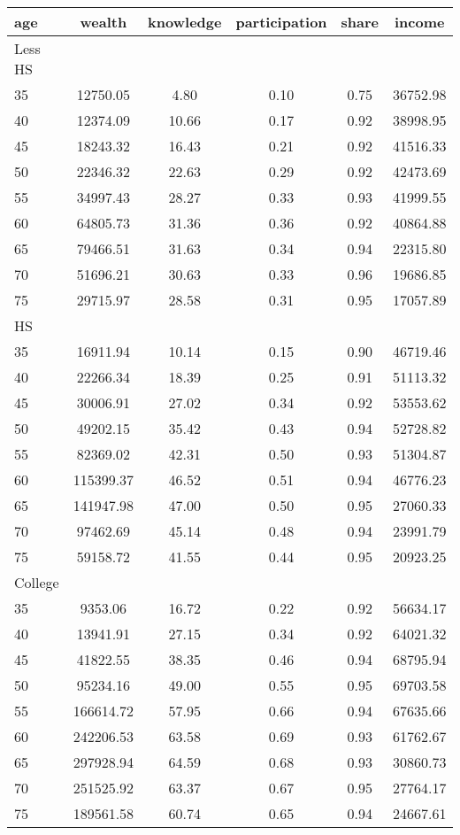 \begin{tabular}{lccccc}
 \hline \hline
  age & wealth & knowledge & participation & share & income \\
 \hline
 Less HS & & & & & \\
 \hline
35 &  12750.05 &      4.80 &      0.10 &      0.75 &  36752.98 \\ 
40 &  12374.09 &     10.66 &      0.17 &      0.92 &  38998.95 \\ 
45 &  18243.32 &     16.43 &      0.21 &      0.92 &  41516.33 \\ 
50 &  22346.32 &     22.63 &      0.29 &      0.92 &  42473.69 \\ 
55 &  34997.43 &     28.27 &      0.33 &      0.93 &  41999.55 \\ 
60 &  64805.73 &     31.36 &      0.36 &      0.92 &  40864.88 \\ 
65 &  79466.51 &     31.63 &      0.34 &      0.94 &  22315.80 \\ 
70 &  51696.21 &     30.63 &      0.33 &      0.96 &  19686.85 \\ 
75 &  29715.97 &     28.58 &      0.31 &      0.95 &  17057.89 \\ 
 \hline
 HS & & & & & \\
 \hline
35 &  16911.94 &     10.14 &      0.15 &      0.90 &  46719.46 \\ 
40 &  22266.34 &     18.39 &      0.25 &      0.91 &  51113.32 \\ 
45 &  30006.91 &     27.02 &      0.34 &      0.92 &  53553.62 \\ 
50 &  49202.15 &     35.42 &      0.43 &      0.94 &  52728.82 \\ 
55 &  82369.02 &     42.31 &      0.50 &      0.93 &  51304.87 \\ 
60 & 115399.37 &     46.52 &      0.51 &      0.94 &  46776.23 \\ 
65 & 141947.98 &     47.00 &      0.50 &      0.95 &  27060.33 \\ 
70 &  97462.69 &     45.14 &      0.48 &      0.94 &  23991.79 \\ 
75 &  59158.72 &     41.55 &      0.44 &      0.95 &  20923.25 \\ 
 \hline
 College & & & & & \\
 \hline
35 &   9353.06 &     16.72 &      0.22 &      0.92 &  56634.17 \\ 
40 &  13941.91 &     27.15 &      0.34 &      0.92 &  64021.32 \\ 
45 &  41822.55 &     38.35 &      0.46 &      0.94 &  68795.94 \\ 
50 &  95234.16 &     49.00 &      0.55 &      0.95 &  69703.58 \\ 
55 & 166614.72 &     57.95 &      0.66 &      0.94 &  67635.66 \\ 
60 & 242206.53 &     63.58 &      0.69 &      0.93 &  61762.67 \\ 
65 & 297928.94 &     64.59 &      0.68 &      0.93 &  30860.73 \\ 
70 & 251525.92 &     63.37 &      0.67 &      0.95 &  27764.17 \\ 
75 & 189561.58 &     60.74 &      0.65 &      0.94 &  24667.61 \\ 
 \hline \hline
 \end{tabular}
